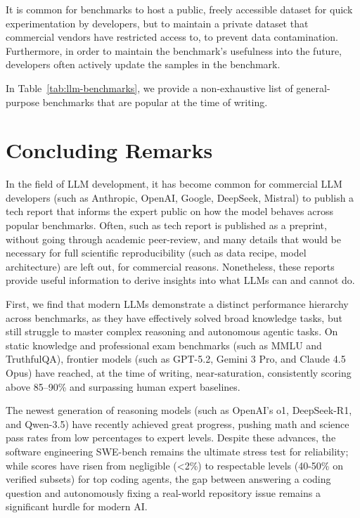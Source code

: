 It is common for benchmarks to host a public, freely accessible dataset for quick experimentation by developers, but to maintain a private dataset that commercial vendors have restricted access to, to prevent data contamination. Furthermore, in order to maintain the benchmark's usefulness into the future, developers often actively update the samples in the benchmark.

In Table~\ref{tab:llm-benchmarks}, we provide a non-exhaustive list of general-purpose benchmarks that are popular at the time of writing.

\section{Concluding Remarks}

In the field of LLM development, it has become common for commercial LLM developers (such as  Anthropic, OpenAI, Google, DeepSeek, Mistral) to publish a tech report that  informs the expert public on how the model behaves across popular  benchmarks. Often, such as tech report is published as a preprint, without going through academic peer-review, and many details that would be  necessary for full scientific reproducibility (such as data recipe, model architecture) are left out, for commercial reasons. Nonetheless, these reports provide useful information %
to derive insights into what LLMs can and cannot do. 

First, we find that modern LLMs demonstrate a distinct performance hierarchy across benchmarks, as they have effectively solved broad knowledge tasks, but  still struggle to master complex reasoning and autonomous agentic tasks. On static knowledge and professional exam benchmarks (such as MMLU and TruthfulQA), frontier models (such as GPT-5.2, Gemini 3 Pro, and Claude 4.5 Opus) have reached, at the time of writing, near-saturation, consistently scoring above 85–90\% and surpassing human expert baselines. 

The newest generation of reasoning models (such as OpenAI's o1, DeepSeek-R1, and Qwen-3.5) have recently achieved great progress, pushing math and science pass rates from low percentages to expert levels. Despite these advances, the software engineering SWE-bench remains the ultimate stress test for reliability; while scores have risen from negligible (<2\%) to respectable levels (40-50\% on verified subsets) for top coding agents, the gap between answering a coding question and autonomously fixing a real-world repository issue remains a significant hurdle for modern AI.


